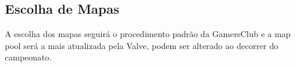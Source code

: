 \subsection{Escolha de Mapas}

A escolha dos mapas seguirá o procedimento padrão da GamersClub e a map pool será a mais atualizada pela Valve, podem ser alterado ao decorrer do campeonato.